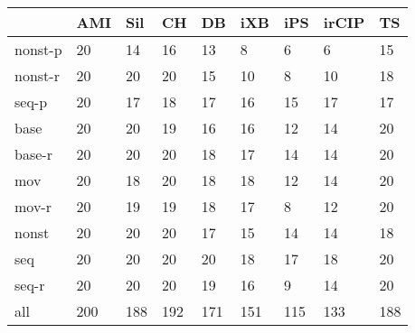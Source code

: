 \begin{tabular}{lllllllll}
\toprule
{} &  AMI &  Sil &   CH &   DB &  iXB &  iPS & irCIP &   TS \\
\midrule
nonst-p &   20 &   14 &   16 &   13 &    8 &    6 &     6 &   15 \\
nonst-r &   20 &   20 &   20 &   15 &   10 &    8 &    10 &   18 \\
seq-p   &   20 &   17 &   18 &   17 &   16 &   15 &    17 &   17 \\
base    &   20 &   20 &   19 &   16 &   16 &   12 &    14 &   20 \\
base-r  &   20 &   20 &   20 &   18 &   17 &   14 &    14 &   20 \\
mov     &   20 &   18 &   20 &   18 &   18 &   12 &    14 &   20 \\
mov-r   &   20 &   19 &   19 &   18 &   17 &    8 &    12 &   20 \\
nonst   &   20 &   20 &   20 &   17 &   15 &   14 &    14 &   18 \\
seq     &   20 &   20 &   20 &   20 &   18 &   17 &    18 &   20 \\
seq-r   &   20 &   20 &   20 &   19 &   16 &    9 &    14 &   20 \\
all     &  200 &  188 &  192 &  171 &  151 &  115 &   133 &  188 \\
\bottomrule
\end{tabular}
